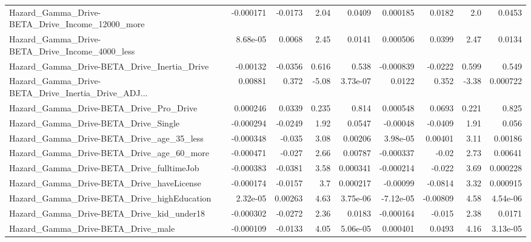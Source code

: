 \begin{tabular}{lrrrrrrrr}
Hazard\_Gamma\_Drive-BETA\_Drive\_Income\_12000\_more    &   -0.000171 &      -0.0173 &     2.04 &   0.0409 &   0.000185 &      0.0182 &          2.0 &        0.0453 \\
Hazard\_Gamma\_Drive-BETA\_Drive\_Income\_4000\_less     &    8.68e-05 &       0.0068 &     2.45 &   0.0141 &   0.000506 &      0.0399 &         2.47 &        0.0134 \\
Hazard\_Gamma\_Drive-BETA\_Drive\_Inertia\_Drive        &    -0.00132 &      -0.0356 &    0.616 &    0.538 &  -0.000839 &     -0.0222 &        0.599 &         0.549 \\
Hazard\_Gamma\_Drive-BETA\_Drive\_Inertia\_Drive\_ADJ... &     0.00881 &        0.372 &    -5.08 & 3.73e-07 &     0.0122 &       0.352 &        -3.38 &      0.000722 \\
Hazard\_Gamma\_Drive-BETA\_Drive\_Pro\_Drive            &    0.000246 &       0.0339 &    0.235 &    0.814 &   0.000548 &      0.0693 &        0.221 &         0.825 \\
Hazard\_Gamma\_Drive-BETA\_Drive\_Single               &   -0.000294 &      -0.0249 &     1.92 &   0.0547 &   -0.00048 &     -0.0409 &         1.91 &         0.056 \\
Hazard\_Gamma\_Drive-BETA\_Drive\_age\_35\_less          &   -0.000348 &       -0.035 &     3.08 &  0.00206 &   3.98e-05 &     0.00401 &         3.11 &       0.00186 \\
Hazard\_Gamma\_Drive-BETA\_Drive\_age\_60\_more          &   -0.000471 &       -0.027 &     2.66 &  0.00787 &  -0.000337 &       -0.02 &         2.73 &       0.00641 \\
Hazard\_Gamma\_Drive-BETA\_Drive\_fulltimeJob          &   -0.000383 &      -0.0381 &     3.58 & 0.000341 &  -0.000214 &      -0.022 &         3.69 &      0.000228 \\
Hazard\_Gamma\_Drive-BETA\_Drive\_haveLicense          &   -0.000174 &      -0.0157 &      3.7 & 0.000217 &   -0.00099 &     -0.0814 &         3.32 &      0.000915 \\
Hazard\_Gamma\_Drive-BETA\_Drive\_highEducation        &    2.32e-05 &      0.00263 &     4.63 & 3.75e-06 &  -7.12e-05 &    -0.00809 &         4.58 &      4.54e-06 \\
Hazard\_Gamma\_Drive-BETA\_Drive\_kid\_under18          &   -0.000302 &      -0.0272 &     2.36 &   0.0183 &  -0.000164 &      -0.015 &         2.38 &        0.0171 \\
Hazard\_Gamma\_Drive-BETA\_Drive\_male                 &   -0.000109 &      -0.0133 &     4.05 & 5.06e-05 &   0.000401 &      0.0493 &         4.16 &      3.13e-05 \\

\end{tabular}
